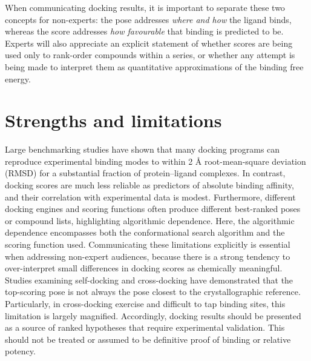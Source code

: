 \documentclass[12pt]{article}
\begin{document}
When communicating docking results, it is important to separate these two concepts for non-experts: the pose addresses \emph{where and how} the ligand binds, whereas the score addresses \emph{how favourable} that binding is predicted to be\cite{CH11_Kitchen2004,CH11_Forli2015,CH11_BindingAffinity2018}.  Experts will also appreciate an explicit statement of whether scores are being used only to rank-order compounds within a series, or whether any attempt is being made to interpret them as quantitative approximations of the binding free energy\cite{CH11_Warren2006,CH11_Plewczynski2011,CH11_BindingAffinity2018}. 

\section{Strengths and limitations}

Large benchmarking studies have shown that many docking programs can reproduce experimental binding modes to within 2 \r{A} root-mean-square deviation (RMSD) for a substantial fraction of protein--ligand complexes.\cite{CH11_Warren2006,CH11_Glide2004,CH11_Plewczynski2011}  In contrast, docking scores are much less reliable as predictors of absolute binding affinity, and their correlation with experimental data is modest\cite{CH11_Warren2006,CH11_EmpiricalScoring2018,CH11_BindingAffinity2018}. Furthermore, different docking engines and scoring functions often produce different best-ranked poses or compound lists, highlighting algorithmic dependence\cite{CH11_Plewczynski2011,CH11_ConsensusDocking2023,CH11_EmpiricalScoring2018}. Here, the algorithmic dependence encompasses both the conformational search algorithm and the scoring function used. Communicating these limitations explicitly is essential when addressing non-expert audiences, because there is a strong tendency to over-interpret small differences in docking scores as chemically meaningful\cite{CH11_BindingAffinity2018,CH11_IsItReliable2018,CH11_Berry2015}.  Studies examining self-docking and cross-docking have demonstrated that the top-scoring pose is not always the pose closest to the crystallographic reference. Particularly, in cross-docking exercise and difficult to tap binding sites, this limitation is largely magnified\cite{CH11_IsItReliable2018,CH11_Warren2006,CH11_cosconati2010}. Accordingly, docking results should be presented as a source of ranked hypotheses that require experimental validation. This should not be treated or assumed to be definitive proof of binding or relative potency\cite{CH11_Forli2015,CH11_Cheng2012,CH11_zhu2022}. 
\end{document}
